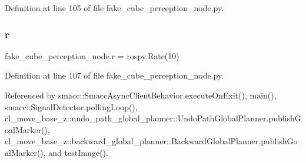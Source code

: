 Definition at line 105 of file fake\+\_\+cube\+\_\+perception\+\_\+node.\+py.

\mbox{\label{namespacefake__cube__perception__node_a36e88703ab69fd35065e8a8d9344903e}} 
\subsubsection{\texorpdfstring{r}{r}}
{\footnotesize\ttfamily fake\+\_\+cube\+\_\+perception\+\_\+node.\+r = rospy.\+Rate(10)}



Definition at line 107 of file fake\+\_\+cube\+\_\+perception\+\_\+node.\+py.



Referenced by smacc\+::\+Smacc\+Async\+Client\+Behavior.\+execute\+On\+Exit(), main(), smacc\+::\+Signal\+Detector.\+polling\+Loop(), cl\+\_\+move\+\_\+base\+\_\+z\+::undo\+\_\+path\+\_\+global\+\_\+planner\+::\+Undo\+Path\+Global\+Planner.\+publish\+Goal\+Marker(), cl\+\_\+move\+\_\+base\+\_\+z\+::backward\+\_\+global\+\_\+planner\+::\+Backward\+Global\+Planner.\+publish\+Goal\+Marker(), and test\+Image().

